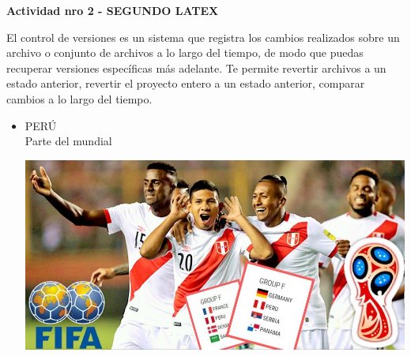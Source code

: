 
\vspace*{0.1in}
\begin{Large}
\textbf{Actividad nro 2 - SEGUNDO LATEX}\\
\end{Large}

\vspace*{0.1in}
\begin{large}
 El control de versiones es un sistema que registra los cambios realizados sobre un archivo o conjunto de archivos a lo largo del tiempo, de modo que puedas recuperar versiones específicas más adelante. Te permite revertir archivos a un estado anterior, revertir el proyecto entero a un estado anterior, comparar cambios a lo largo del tiempo.\\
\end{large}


\begin{itemize}
	\item PERÚ
	\\Parte del mundial 
	\begin{center}
	\includegraphics[width=15cm]{./Imagenes/act2_1} 
	\end{center}

\end{itemize}
